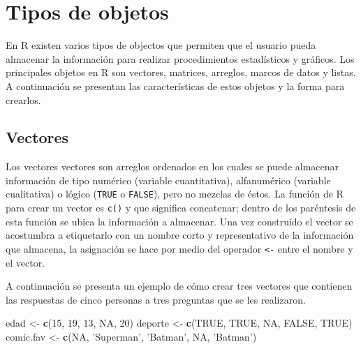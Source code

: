 \documentclass[10pt,]{krantz}
\makeatletter
\newenvironment{Shaded}{\begin{snugshade}}{\end{snugshade}}
\newcommand{\KeywordTok}[1]{\textcolor[rgb]{0.13,0.29,0.53}{\textbf{#1}}}
\newcommand{\DecValTok}[1]{\textcolor[rgb]{0.00,0.00,0.81}{#1}}
\newcommand{\StringTok}[1]{\textcolor[rgb]{0.31,0.60,0.02}{#1}}
\newcommand{\OtherTok}[1]{\textcolor[rgb]{0.56,0.35,0.01}{#1}}
\newcommand{\NormalTok}[1]{#1}
\newenvironment{kframe}{%
\medskip{}
\setlength{\fboxsep}{.8em}
 \def\at@end@of@kframe{}%
 \ifinner\ifhmode%
  \def\at@end@of@kframe{\end{minipage}}%
  \begin{minipage}{\columnwidth}%
 \fi\fi%
 \def\FrameCommand##1{\hskip\@totalleftmargin \hskip-\fboxsep
 \colorbox{shadecolor}{##1}\hskip-\fboxsep
     \hskip-\linewidth \hskip-\@totalleftmargin \hskip\columnwidth}%
 \MakeFramed {\advance\hsize-\width
   \@totalleftmargin\z@ \linewidth\hsize
   \@setminipage}}%
 {\par\unskip\endMakeFramed%
 \at@end@of@kframe}
\renewenvironment{Shaded}{\begin{kframe}}{\end{kframe}}
\makeatother
\begin{document}
\chapter{Tipos de objetos}\label{objetos}

En R existen varios tipos de objectos que permiten que el usuario pueda
almacenar la información para realizar procedimientos estadísticos y
gráficos. Los principales objetos en R son vectores, matrices, arreglos,
marcos de datos y listas. A continuación se presentan las
características de estos objetos y la forma para crearlos.

\section{\texorpdfstring{Vectores 
\label{vector}}{Vectores  }}\label{vectores}

Los vectores vectores son arreglos ordenados en los cuales se puede
almacenar información de tipo numérico (variable cuantitativa),
alfanumérico (variable cualitativa) o lógico (\texttt{TRUE} o
\texttt{FALSE}), pero no mezclas de éstos. La función de R para crear un
vector es \texttt{c()} y que significa concatenar; dentro de los
paréntesis de esta función se ubica la información a almacenar. Una vez
construído el vector se acostumbra a etiquetarlo con un nombre corto y
representativo de la información que almacena, la asignación se hace por
medio del operador \texttt{\textless{}-} entre el nombre y el vector.

A continuación se presenta un ejemplo de cómo crear tres vectores que
contienen las respuestas de cinco personas a tres preguntas que se les
realizaron.

\begin{Shaded}
\begin{Highlighting}[]
\NormalTok{edad <-}\StringTok{ }\KeywordTok{c}\NormalTok{(}\DecValTok{15}\NormalTok{, }\DecValTok{19}\NormalTok{, }\DecValTok{13}\NormalTok{, }\OtherTok{NA}\NormalTok{, }\DecValTok{20}\NormalTok{)}
\NormalTok{deporte <-}\StringTok{ }\KeywordTok{c}\NormalTok{(}\OtherTok{TRUE}\NormalTok{, }\OtherTok{TRUE}\NormalTok{, }\OtherTok{NA}\NormalTok{, }\OtherTok{FALSE}\NormalTok{, }\OtherTok{TRUE}\NormalTok{)}
\NormalTok{comic.fav <-}\StringTok{ }\KeywordTok{c}\NormalTok{(}\OtherTok{NA}\NormalTok{, }\StringTok{'Superman'}\NormalTok{, }\StringTok{'Batman'}\NormalTok{, }\OtherTok{NA}\NormalTok{, }\StringTok{'Batman'}\NormalTok{)}
\end{Highlighting}
\end{Shaded}
\end{document}
